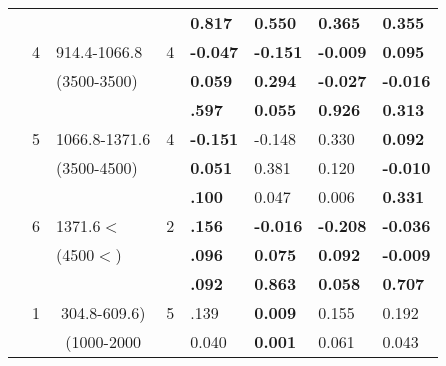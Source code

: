 \begin{table}[p]
\begin{tabular}{ccccllll}
\multicolumn{1}{c}{} &  \multicolumn{1}{c}{} &  \multicolumn{1}{c}{} &  \multicolumn{1}{c}{} &  \textbf{0.817 } &\textbf{0.550}& \textbf{0.365 } & \textbf{0.355 }  \\ \cline{5-8}\noalign{\smallskip}
 \multicolumn{1}{c}{} &  \multicolumn{1}{c}{4} &  \multicolumn{1}{l}{914.4-1066.8} &  \multicolumn{1}{c}{4} &\textbf{-0.047}& \textbf{-0.151 } & \textbf{-0.009 } & \textbf{0.095 }  \\ 
 \multicolumn{1}{c}{} &  \multicolumn{1}{c}{} &  \multicolumn{1}{l}{(3500-3500)} &  \multicolumn{1}{c}{} &\textbf{0.059}&\textbf{0.294 } & \textbf{-0.027 } & \textbf{-0.016 }  \\ 
 \multicolumn{1}{c}{} &  \multicolumn{1}{c}{} &  \multicolumn{1}{c}{} &  \multicolumn{1}{c}{} &\textbf{.597}& \textbf{0.055 } & \textbf{0.926 } & \textbf{0.313 }  \\ \cline{5-8}\noalign{\smallskip}
 \multicolumn{1}{c}{} &  \multicolumn{1}{c}{5} &  \multicolumn{1}{l}{1066.8-1371.6} &  \multicolumn{1}{c}{4}&\textbf{-0.151} &-0.148  & 0.330  & \textbf{0.092 }  \\ 
 \multicolumn{1}{c}{} &  \multicolumn{1}{c}{} &  \multicolumn{1}{l}{(3500-4500)} &  \multicolumn{1}{c}{} &\textbf{0.051}& 0.381  & 0.120  & \textbf{-0.010 }  \\ 
 \multicolumn{1}{c}{} &  \multicolumn{1}{c}{} &  \multicolumn{1}{c}{} &  \multicolumn{1}{c}{}&\textbf{.100} & 0.047  & 0.006  & \textbf{0.331 }   \\ \cline{5-8}\noalign{\smallskip}
 \multicolumn{1}{c}{} &  \multicolumn{1}{c}{6} &  \multicolumn{1}{l}{1371.6$<$} &  \multicolumn{1}{c}{2} &\textbf{.156}& \textbf{-0.016 } & \textbf{-0.208 } & \textbf{-0.036 }  \\ 
 \multicolumn{1}{c}{} &  \multicolumn{1}{c}{} &  \multicolumn{1}{l}{(4500$<$)} &  \multicolumn{1}{c}{}&\textbf{.096} & \textbf{0.075 } & \textbf{0.092 } & \textbf{-0.009 } \\ 
 \multicolumn{1}{c}{} &  \multicolumn{1}{c}{} &  \multicolumn{1}{c}{} &  \multicolumn{1}{c}{} &\textbf{.092}& \textbf{0.863 } & \textbf{0.058 } & \textbf{0.707 }   \\ \hline\noalign{\smallskip}
 \multicolumn{1}{c}{2003-2008} &  \multicolumn{1}{c}{1} &  \multicolumn{1}{p{2cm}}{304.8-609.6)} &  \multicolumn{1}{c}{5} & .139 & \textbf{0.009 } & 0.155  & 0.192  \\ 
 \multicolumn{1}{c}{} &  \multicolumn{1}{c}{} &  \multicolumn{1}{p{2cm}}{ (1000-2000} &  \multicolumn{1}{c}{} &0.040 & \textbf{0.001 } & 0.061  & 0.043  \\ 

\end{tabular}
\end{table}
